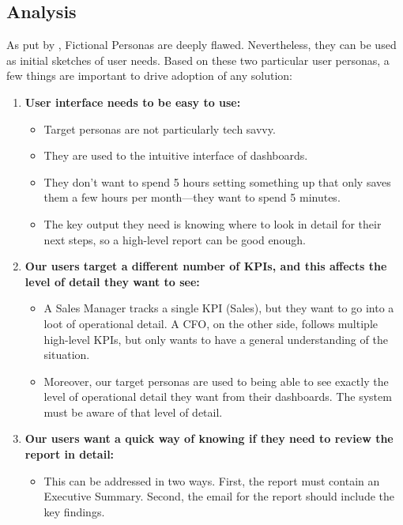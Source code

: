 \documentclass[a4paper]{report}
\begin{document}
\subsection{Analysis}

As put by \cite{ixdf_personas_2025}, Fictional Personas are deeply flawed. Nevertheless, they can be used as initial sketches of user needs. Based on these two particular user personas, a few things are important to drive adoption of any solution:

\begin{enumerate}
    \item \textbf{User interface needs to be easy to use:}
    \begin{itemize}
        \item Target personas are not particularly tech savvy.
        \item They are used to the intuitive interface of dashboards.
        \item They don’t want to spend 5 hours setting something up that only saves them a few hours per month—they want to spend 5 minutes.
        \item The key output they need is knowing where to look in detail for their next steps, so a high-level report can be good enough.
    \end{itemize}

    \item \textbf{Our users target a different number of KPIs, and this affects the level of detail they want to see:}
    \begin{itemize}
        \item A Sales Manager tracks a single KPI (Sales), but they want to go into a loot of operational detail. A CFO, on the other side, follows multiple high-level KPIs, but only wants to have a general understanding of the situation.
        \item Moreover, our target personas are used to being able to see exactly the level of operational detail they want from their dashboards. The system must be aware of that level of detail.
    \end{itemize}
    \item \textbf{Our users want a quick way of knowing if they need to review the report in detail:}
    \begin{itemize}
        \item This can be addressed in two ways. First, the report must contain an Executive Summary. Second, the email for the report should include the key findings.
    \end{itemize}
\end{enumerate}
\end{document}
